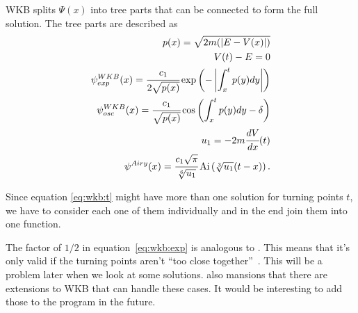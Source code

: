 \documentclass[11pt,DIV=10,final]{scrreprt} %
\begin{document}
WKB splits $\Psi(x)$ into tree parts that can be connected to form the full solution. The tree parts are described as
\begin{align}
\label{eq:wkb:momentum}
  p(x) = \sqrt{2m(|E - V(x)|)} \\
\label{eq:wkb:t}
  V(t) - E = 0 \\
\label{eq:wkb:exp}
  \psi^{WKB}_{exp}(x)= \cfrac{c_{1}}{2 \sqrt{p(x)}} \exp\left(-\left|\int_{x}^{t}p(y) dy\right|\right) \\
\label{eq:wkb:osc}
  \psi^{WKB}_{osc} (x)= \cfrac{c_{1}}{\sqrt{p(x)}} \cos\left(\int_{x}^{t}p(y) dy - \delta \right) \\
  u_{1} = -2 m \cfrac{dV}{dx}(t) \\
\label{eq:airy}
  \psi^{Airy}(x) = \cfrac{c_{1} \sqrt{\pi}}{\sqrt[6]{u_{1}}} \operatorname{Ai}\left(\sqrt[3]{u_{1}} (t - x)\right).
\end{align}

Since equation \ref{eq:wkb:t} might have more than one solution for turning points $t$, we have to consider each one of them individually and in the end join them into one function.

The factor of $1/2$ in equation~\ref{eq:wkb:exp} is analogous to \citep[eq. 92]{robert2020wkb}. This means that it's only valid if the turning points aren't ``too close together''~\citep{robert2020wkb}.
This will be a problem later when we look at some solutions. \cite{robert2020wkb} also mansions that there are extensions to WKB that can handle these cases. It would be interesting to add those to the
program in the future.
\end{document}
